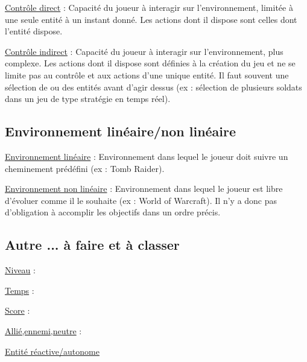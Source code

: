 \underline{Contrôle direct} :
Capacité du joueur à interagir sur l’environnement, limitée à une seule entité à un instant donné. 
Les actions dont il dispose sont celles dont l'entité dispose.

\underline{Contrôle indirect} :
Capacité du joueur à interagir sur l’environnement, plus complexe. 
Les actions dont il dispose sont définies à la création du jeu et ne se limite pas au contrôle et aux actions d'une unique entité.
Il faut souvent une sélection de ou des entités avant d'agir dessus (ex : sélection de plusieurs soldats dans un jeu de type stratégie en temps réel).

\subsection*{Environnement linéaire/non linéaire}

\underline{Environnement linéaire} : 
Environnement dans lequel le joueur doit suivre un cheminement prédéfini (ex : Tomb Raider).

\underline{Environnement non linéaire} : 
Environnement dans lequel le joueur est libre d'évoluer comme il le souhaite (ex : World of Warcraft). 
Il n'y a donc pas d'obligation à accomplir les objectifs dans un ordre précis.


\subsection*{Autre ... à faire et à classer}

\underline{Niveau} :

\underline{Temps} :

\underline{Score} :

\underline{Allié,ennemi,neutre} :

\underline{Entité réactive/autonome}

